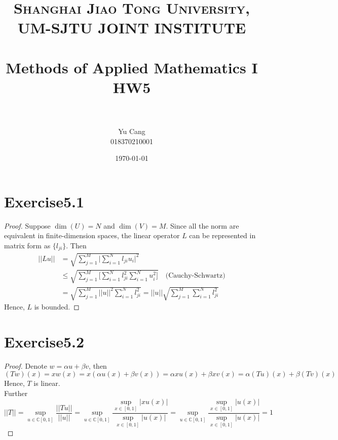 \documentclass[paper=a4, fontsize=11pt]{scrartcl} %
\title{	
\normalfont \normalsize 
\textsc{Shanghai Jiao Tong University, UM-SJTU JOINT INSTITUTE} \\ [25pt] %
\horrule{0.5pt} \\[0.4cm] %
\huge Methods of Applied Mathematics I\\ HW5 \\ %
\horrule{2pt} \\[0.5cm] %
}
\author{Yu Cang \\ 018370210001} %
\date{\normalsize \today} %
\numberwithin{equation}{section} %
\numberwithin{figure}{section} %
\numberwithin{table}{section} %
\begin{document}
\maketitle %

\section{Exercise5.1}
	\begin{proof}
		Suppose $\dim(U) = N$ and $\dim(V)=M$. Since all the norm are equivalent in finite-dimension spaces, the linear operator $L$ can be represented in matrix form as $\{l_{ji}\}$. Then
		\begin{equation}
			\begin{aligned}
				||Lu|| & = \sqrt{\sum_{j=1}^{M}\Big|\sum_{i=1}^{N}l_{ji} u_i\Big|^2}\\
					   & \leq \sqrt{\sum_{j=1}^{M} \Big[\sum_{i=1}^{N} l_{ji}^2 \sum_{i=1}^{N} u_{i}^2\Big]} \quad \text{(Cauchy-Schwartz)}\\
					   & = \sqrt{\sum_{j=1}^{M} ||u||^2\sum_{i=1}^{N} l_{ji}^2}
					    = ||u||\sqrt{\sum_{j=1}^{M}\sum_{i=1}^{N} l_{ji}^2}
			\end{aligned}
		\end{equation}
		Hence, $L$ is bounded.
	\end{proof}

\section{Exercise5.2}
	\begin{proof}
		Denote $w = \alpha u + \beta v$, then
		\begin{equation}
			(Tw)(x) = xw(x) = x(\alpha u(x) + \beta v(x)) = \alpha xu(x) + \beta xv(x) = \alpha (Tu)(x) + \beta (Tv)(x)
		\end{equation}
		Hence, $T$ is linear.\\ Further
		\begin{equation}
			||T|| = \sup_{u\in\mathbb{C}[0, 1]}\frac{||Tu||}{||u||} = \sup_{u\in\mathbb{C}[0, 1]} \frac{\sup_{x\in[0, 1]}|xu(x)|}{\sup_{x\in[0, 1]}|u(x)|} = \sup_{u\in\mathbb{C}[0, 1]} \frac{\sup_{x\in[0, 1]}|u(x)|}{\sup_{x\in[0, 1]}|u(x)|} = 1
		\end{equation}
	\end{proof}
\end{document}

